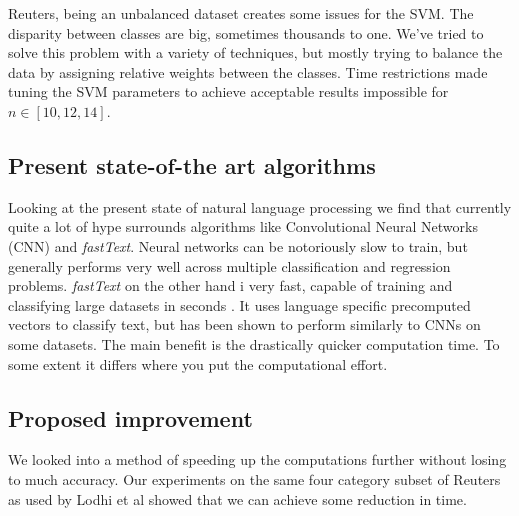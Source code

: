 Reuters, being an unbalanced dataset creates some issues for the SVM. The disparity between classes are big, sometimes thousands to one. We've tried to solve this problem with a variety of techniques, but mostly trying to balance the data by assigning relative weights between the classes. Time restrictions made tuning the SVM parameters to achieve acceptable results impossible for $ n \in [10,12,14] $. 



\subsection{Present state-of-the art algorithms}
Looking at the present state of natural language processing we find that currently quite a lot of hype surrounds algorithms like Convolutional Neural Networks (CNN) and \textit{fastText}. Neural networks can be notoriously slow to train, but generally performs very well across multiple classification and regression problems. \textit{fastText} on the other hand i very fast, capable of training and classifying large datasets in seconds \cite{joulin2016bag}. It uses language specific precomputed vectors to classify text, but has been shown to perform similarly to CNNs on some datasets. The main benefit is the drastically quicker computation time. To some extent it differs where you put the computational effort.

\subsection{Proposed improvement}

We looked into a method of speeding up the computations further without losing to much accuracy. Our experiments on the same four category subset of Reuters as used by Lodhi et al showed that we can achieve some reduction in time.
